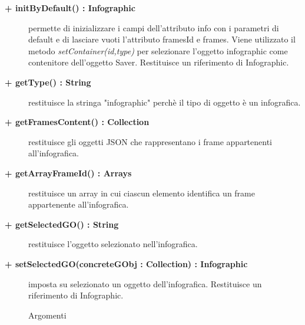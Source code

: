 \begin{description}
\begin{description}
		\item[\textbf{\color{blue}+ initByDefault() : Infographic			}] \hfill
			permette di inizializzare i campi dell'attributo info con i parametri di default e di lasciare vuoti l'attributo framesId e frames. Viene utilizzato il metodo \textit{setContainer(id,type)} per selezionare l'oggetto infographic come contenitore dell'oggetto Saver. Restituisce un riferimento di Infographic.

\end{description}

\begin{description}
		\item[\textbf{\color{blue}+ getType() : String			}] \hfill
			restituisce la stringa "infographic" perchè il tipo di oggetto è un infografica.

\end{description}

\begin{description}
		\item[\textbf{\color{blue}+ getFramesContent() : Collection			}] \hfill
			restituisce gli oggetti JSON che rappresentano i frame appartenenti all'infografica.

\end{description}

\begin{description}
		\item[\textbf{\color{blue}+ getArrayFrameId() : Arrays			}] \hfill
			restituisce un array in cui ciascun elemento identifica un frame appartenente all'infografica.

\end{description}

\begin{description}
		\item[\textbf{\color{blue}+ getSelectedGO() : String			}] \hfill
			restituisce l'oggetto selezionato nell'infografica.

\end{description}

\begin{description}
		\item[\textbf{\color{blue}+ setSelectedGO(concreteGObj : Collection) : Infographic			}] \hfill
			imposta su selezionato un oggetto dell'infografica. Restituisce un riferimento di Infographic.

		\begin{description}
			\item[Argomenti] \hfill
				\begin{itemize}
				

\end{itemize}
\end{description}
\end{description}
\end{description}
